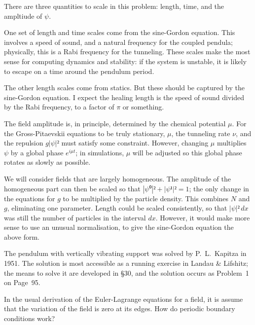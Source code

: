
There are three quantities to scale in this problem: length, time, and the ampltiude of $ψ$.

One set of length and time scales come from the sine-Gordon equation.  This involves a speed of sound, and a natural frequency for the coupled pendula; physically, this is a Rabi frequency for the tunneling.  These scales make the most sense for computing dynamics and stability: if the system is unstable, it is likely to escape on a time around the pendulum period.

The other length scales come from statics.  But these should be captured by the sine-Gordon equation.  I expect the healing length is the speed of sound divided by the Rabi frequency, to a factor of $π$ or something.

The field amplitude is, in principle, determined by the chemical potential $μ$.  For the Gross-Pitaevskii equations to be truly stationary, $μ$, the tunneling rate $ν$, and the repulsion $g|ψ|²$ must satisfy some constraint.  However, changing $μ$ multiplies $ψ$ by a global phase $e^{iμt}$; in simulations, $μ$ will be adjusted so this global phase rotates as slowly as possible.

We will consider fields that are largely homogeneous.  The amplitude of the homogeneous part can then be scaled so that $|ψ⁰|²+|ψ¹|²=1$; the only change in the equations for $g$ to be multiplied by the particle density.  This combines $N$ and $g$, eliminating one parameter.  Length could be scaled consistently, so that $|ψ|²\,dx$ was still the number of particles in the interval $dx$.  However, it would make more sense to use an unusual normalisation, to give the sine-Gordon equation the above form.


The pendulum with vertically vibrating support was solved by P.~L.~Kapitza in 1951.  The solution is most accessible as a running exercise in Landau \& Lifshitz; the means to solve it are developed in \S 30, and the solution occurs as Problem~1 on Page~95.


In the usual derivation of the Euler-Lagrange equations for a field, it is assume that the variation of the field is zero at its edges.  How do periodic boundary conditions work?

\bye